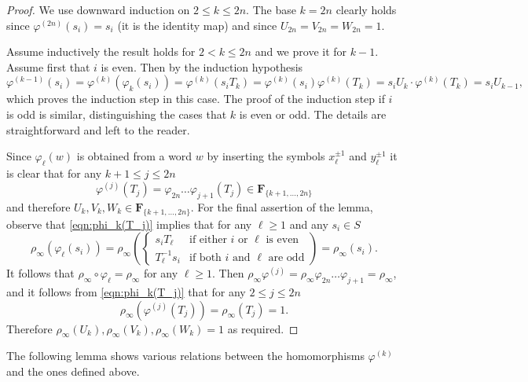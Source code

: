 \documentclass[12pt,reqno,a4paper]{article}
\theoremstyle{definition}
\theoremstyle{remark}
\numberwithin{equation}{section}
\numberwithin{figure}{section}
\newcommand{\B}[1]{{\mathbf #1}}
\begin{document}
\begin{proof}
We use downward induction on $2 \leq k \leq 2n$.
The base $k=2n$ clearly holds since $\varphi^{(2n)}(s_i)=s_i$ (it is the identity map) and since $U_{2n}=V_{2n}=W_{2n}=1$.

Assume inductively the result holds for $2<k \leq 2n$ and we prove it for $k-1$.
Assume first that $i$ is even.
Then by the induction hypothesis
\[
\varphi^{(k-1)}(s_i) 
= 
\varphi^{(k)}(\varphi_k(s_i)) 
=
\varphi^{(k)}(s_iT_k)
=
\varphi^{(k)}(s_i)  \varphi^{(k)}(T_k)
=
s_i U_k \cdot \varphi^{(k)}(T_k)
=
s_i U_{k-1},
\]
which proves the induction step in this case.
The proof of the induction step if $i$ is odd is similar, distinguishing the cases that $k$ is even or odd.
The details are straightforward and left to the reader.

Since $\varphi_\ell(w)$ is obtained from a word $w$ by inserting the symbols $x_\ell^{\pm 1}$ and $y_\ell^{\pm 1}$ it is clear that for any $k+1 \leq j \leq 2n$
\[
\varphi^{(j)}(T_j) = \varphi_{2n} \dots \varphi_{j+1}(T_j) \in \B F_{\{ k+1, \dots,2n\}}
\]
and therefore $U_k, V_k, W_k \in \B F_{\{ k+1, \dots,2n\}}$.
For the final assertion of the lemma, observe that \eqref{eqn:phi_k(T_j)} implies that for any $\ell\geq 1$ and any $s_i \in S$
\[
\rho_\infty (\varphi_\ell(s_i))
=
\rho_{\infty}
\left(
\left\{
\begin{array}{ll}
s_iT_\ell & \text{if either $i$ or $\ell$ is even}
\\
T_\ell^{-1}s_i & \text{if both $i$ and $\ell$ are odd}
\end{array}
\right.
\right)
=\rho_\infty(s_i).
\]
It follows that $\rho_\infty \circ \varphi_\ell =\rho_\infty$ for any $\ell\geq 1$.
Then $\rho_\infty \varphi^{(j)} = \rho_\infty \varphi_{2n} \dots \varphi_{j+1}=\rho_\infty$, and it follows from \eqref{eqn:phi_k(T_j)} that for any $2 \leq j \leq 2n$
\[
\rho_\infty (\varphi^{(j)}(T_j)) = \rho_\infty(T_j)=1.
\]
Therefore $\rho_\infty(U_k), \rho_\infty(V_k), \rho_\infty(W_k)=1$ as required.
\end{proof}




The following lemma shows various relations between the homomorphisms $\varphi^{(k)}$
and the ones defined above.
\end{document}
